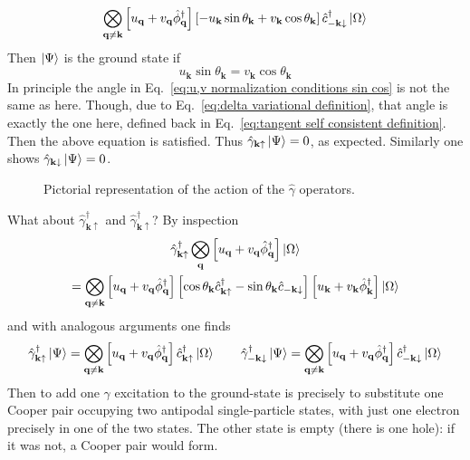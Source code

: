 \[
	\bigotimes_{\mathbf{q}\neq\mathbf{k}} \left[{u_\mathbf{q} + v_\mathbf{q} \hat{\phi}_\mathbf{q}^\dagger}\right] \left[{- u_\mathbf{k} \sin\theta_\mathbf{k}  + v_\mathbf{k} \cos\theta_\mathbf{k}}\right] \hat{c}_{-\mathbf{k}\downarrow}^\dagger \ket{\Omega}
\]
Then $\ket{\Psi}$ is the ground state if
\[
	u_\mathbf{k} \sin\theta_\mathbf{k} = v_\mathbf{k} \cos\theta_\mathbf{k}
\]
In principle the angle in Eq.~\eqref{eq:u,v normalization conditions sin cos}  is not the same as here. Though, due to Eq.~\eqref{eq:delta variational definition}, that angle is exactly the one here, defined back in Eq.~\eqref{eq:tangent self consistent definition}. Then the above equation is satisfied. Thus $\hat{\gamma}_{\mathbf{k}\uparrow} \ket{\Psi} = 0$, as expected. Similarly one shows $\hat{\gamma}_{\mathbf{k}\downarrow} \ket{\Psi} = 0$.

\begin{figure}
	\centering
	
	\caption{Pictorial representation of the action of the $\hat{\gamma}$ operators.}
	\label{fig:bogoliubov fermions}
\end{figure}

What about $\hat{\gamma}_{\mathbf{k}\uparrow}^\dagger$ and $\hat{\gamma}_{\mathbf{k}\uparrow}^\dagger$? By inspection
\begin{multline*}
	\hat{\gamma}_{\mathbf{k}\uparrow}^\dagger \bigotimes_\mathbf{q} \left[{u_\mathbf{q} + v_\mathbf{q} \hat{\phi}_\mathbf{q}^\dagger}\right] \ket{\Omega} \\ = \bigotimes_{\mathbf{q}\neq\mathbf{k}} \left[{u_\mathbf{q} + v_\mathbf{q} \hat{\phi}_\mathbf{q}^\dagger}\right] \left[{\cos\theta_\mathbf{k} \hat{c}_{\mathbf{k}\uparrow}^\dagger - \sin\theta_\mathbf{k} \hat{c}_{-\mathbf{k}\downarrow}}\right] \left[{u_\mathbf{k} + v_\mathbf{k} \hat{\phi}_\mathbf{k}^\dagger}\right] \ket{\Omega}
\end{multline*}
and with analogous arguments one finds
\[
	\hat{\gamma}_{\mathbf{k}\uparrow}^\dagger \ket{\Psi} = \bigotimes_{\mathbf{q}\neq\mathbf{k}} \left[{u_\mathbf{q} + v_\mathbf{q} \hat{\phi}_\mathbf{q}^\dagger}\right] \hat{c}_{\mathbf{k}\uparrow}^\dagger \ket{\Omega}
	\qquad
	\hat{\gamma}_{-\mathbf{k}\downarrow}^\dagger \ket{\Psi} = \bigotimes_{\mathbf{q}\neq\mathbf{k}} \left[{u_\mathbf{q} + v_\mathbf{q} \hat{\phi}_\mathbf{q}^\dagger}\right] \hat{c}_{-\mathbf{k}\downarrow}^\dagger \ket{\Omega}
\]
Then to add one $\gamma$ excitation to the ground-state is precisely to substitute one Cooper pair occupying two antipodal single-particle states, with just one electron precisely in one of the two states. The other state is empty (there is one hole): if it was not, a Cooper pair would form.

